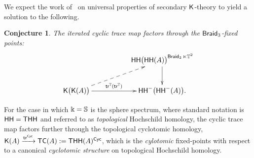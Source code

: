 \documentclass{amsart}
\newtheorem{conj}{Conjecture}
\theoremstyle{definition}
\theoremstyle{remark}
\newcommand{\lag}{\langle}
\newcommand{\rag}{\rangle}
\newcommand{\xra}{\xrightarrow}
\DeclareMathOperator{\Braid}{{\sf Braid}_3}
\DeclareMathOperator{\sHH}{\sf HH}
\DeclareMathOperator{\Obj}{\sf Obj}
\DeclareMathOperator{\Perf}{\sf Perf}
\begin{document}
We expect the work of~\cite{reuben} on universal properties of secondary $\mathsf K$-theory to yield a solution to the following.
\begin{conj}
\label{c1}
The iterated cyclic trace map factors through the $\Braid$-fixed points:
\[
\xymatrix{
&&
\sHH\bigl( \sHH( A ) \bigr)^{\Braid \ltimes \TT^2} \ar[d] 
\\
\sK\bigl(\sK(A) \bigr)
\ar[rr]^-{~{\sf tr}^{\TT}( {\sf tr}^{\TT})~}
\ar@{-->}[urr]
&&
\sHH^-\bigl( \sHH^-(A) \bigr)
.
}
\]




\end{conj}

For the case in which $\Bbbk = \mathbb S$ is the sphere spectrum, where standard notation is $\sHH = {\sf THH}$ and referred to as \emph{topological} Hochschild homology, 
the cyclic trace map factors further through the topological cyclotomic homology,
$\sK(A) \xra{{\sf tr}^{\sf Cyc}} {\sf TC}(A) := {\sf THH}(A)^{\sf Cyc}$, 
which is the \emph{cylotomic} fixed-points with respect to a canonical \emph{cyclotomic structure} on topological Hochschild homology.  
\end{document}
